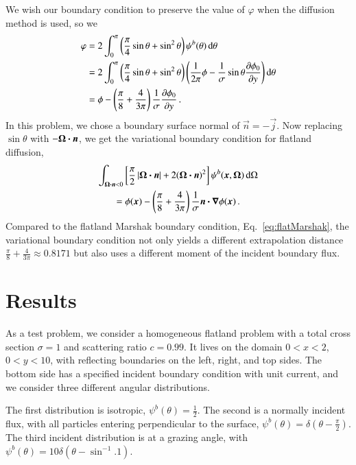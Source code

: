 \documentclass{anstrans}
\begin{document}
We wish our boundary condition to preserve the value of $\varphi$ when the
diffusion method is used, so we 
\begin{align*}
 \varphi &= 2\int_{0}^{\pi} \left( \frac{\pi}{4} \sin\theta + \sin^2\theta \right)
 \psi^b(\theta) \mathop{}\!\mathrm{d}\theta
 \\
 &= 
  2\int_{0}^{\pi} \left( \frac{\pi}{4} \sin\theta + \sin^2\theta \right)
 \left( \frac{1}{2\pi} \phi -
  \frac{1}{\sigma} \sin\theta \frac{\partial \phi_0}{\partial y}\right)\mathop{}\!\mathrm{d}\theta
\\
 &= 
  \phi
- \left( \frac{\pi}{8} + \frac{4}{3\pi} \right) \frac{1}{\sigma} \frac{\partial \phi_0}{\partial y}
\,.
\end{align*}
In this problem, we chose a boundary surface normal of $\vec{n}=-\vec{j}$. Now
replacing $\sin \theta$ with $-\bm{\Omega}\bm{\cdot}\bm{n}$, we get the 
variational boundary condition for flatland diffusion,
\begin{multline} \label{eq:flatVarBc}
\int_{\bm{\Omega}\bm{\cdot}\bm{n} < 0} \left[ \frac{\pi}{2}
\left| \bm{\Omega}\bm{\cdot}\bm{n} \right| + 2 (\bm{\Omega}\bm{\cdot}\bm{n})^2 \right]
\psi^b(\bm{x}, \bm{\Omega}) \mathop{}\!\mathrm{d}\Omega
\\
= 
  \phi(\bm{x})
  - \left( \frac{\pi}{8} + \frac{4}{3\pi} \right) \frac{1}{\sigma}
  \bm{n}\bm{\cdot}\bm{\nabla} \phi(\bm{x})\,.
\end{multline}
Compared to the flatland Marshak boundary condition,
Eq.~\eqref{eq:flatMarshak}, the variational boundary condition not only yields a
different extrapolation distance $\frac{\pi}{8} + \frac{4}{3\pi} \approx
0.8171$ but also uses a different moment of the incident boundary flux.

\section{Results}
As a test problem, we consider a homogeneous flatland problem with a
total cross section $\sigma=1$ and scattering ratio $c=0.99$. It lives on the
domain $0 < x < 2$, $0 < y < 10$, with reflecting boundaries on the left,
right, and top sides. The bottom side has a specified incident boundary
condition with unit current, and we consider three different angular
distributions.

The first distribution is isotropic, $\psi^b(\theta) = \frac{1}{2}$. The second
is a normally incident flux, with all particles entering
perpendicular to the surface, $\psi^b(\theta) = \delta(\theta -
\frac{\pi}{2})$. The third incident distribution is at a grazing angle, with 
$\psi^b(\theta) = 10 \delta(\theta - \sin^{-1}.1)$.
\end{document}
